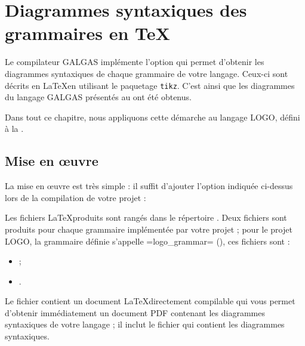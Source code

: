 
\chapter{Diagrammes syntaxiques des grammaires en TeX}

Le compilateur GALGAS implémente l'option  qui permet d'obtenir les diagrammes syntaxiques de chaque grammaire de votre langage. Ceux-ci sont décrits en \LaTeX en utilisant le paquetage \texttt{tikz}\label{tikz}. C'est ainsi que les diagrammes du langage GALGAS présentés au  ont été obtenus.

Dans tout ce chapitre, nous appliquons cette démarche au langage LOGO, défini à la .

\section{Mise en œuvre}

La mise en œuvre est très simple : il suffit d'ajouter l'option indiquée ci-dessus lors de la compilation de votre projet :
\begin{description}
  \item[ ] 
\end{description}

Les fichiers \LaTeX produits sont rangés dans le répertoire . Deux fichiers sont produits pour chaque grammaire implémentée par votre projet ; pour le projet LOGO, la grammaire définie s'appelle \ggs=logo_grammar= (), ces fichiers sont :
\begin{itemize}
\item {} ;
\item {}.
\end{itemize}

Le fichier  contient un document \LaTeX directement compilable qui vous permet d'obtenir immédiatement un document PDF contenant les diagrammes syntaxiques de votre langage ; il inclut le fichier  qui contient les diagrammes syntaxiques.




